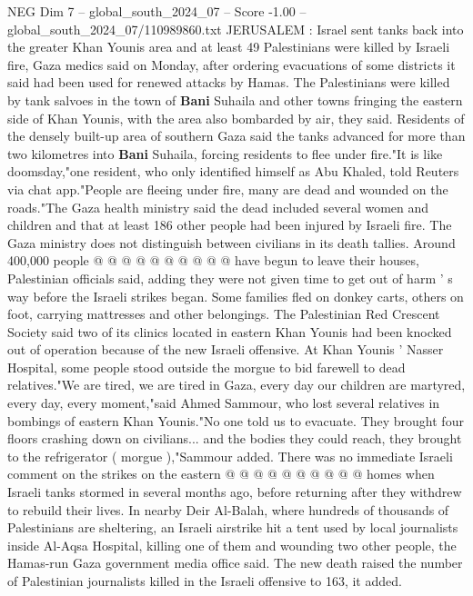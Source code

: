 \begin{textsample}{NEG Dim 7 – global\_south\_2024\_07 – Score -1.00 – global\_south\_2024\_07/110989860.txt}  \label{ex:f7_neg_351}
JERUSALEM : Israel sent tanks back into the greater Khan Younis area and at least 49 Palestinians were killed by Israeli fire, Gaza medics said on Monday, after ordering evacuations of some districts it said had been used for renewed attacks by Hamas.
The Palestinians were killed by tank salvoes in the town of \textbf{Bani} Suhaila and other towns fringing the eastern side of Khan Younis, with the area also bombarded by air, they said.
Residents of the densely built-up area of southern Gaza said the tanks advanced for more than two kilometres into \textbf{Bani} Suhaila, forcing residents to flee under fire."It is like doomsday,"one resident, who only identified himself as Abu Khaled, told Reuters via chat app."People are fleeing under fire, many are dead and wounded on the roads."The Gaza health ministry said the dead included several women and children and that at least 186 other people had been injured by Israeli fire.
The Gaza ministry does not distinguish between civilians in its death tallies.
Around 400,000 people @ @ @ @ @ @ @ @ @ @ have begun to leave their houses, Palestinian officials said, adding they were not given time to get out of harm ' s way before the Israeli strikes began.
Some families fled on donkey carts, others on foot, carrying mattresses and other belongings.
The Palestinian Red Crescent Society said two of its clinics located in eastern Khan Younis had been knocked out of operation because of the new Israeli offensive.
At Khan Younis ' Nasser Hospital, some people stood outside the morgue to bid farewell to dead relatives."We are tired, we are tired in Gaza, every day our children are martyred, every day, every moment,"said Ahmed Sammour, who lost several relatives in bombings of eastern Khan Younis."No one told us to evacuate.
They brought four floors crashing down on civilians... and the bodies they could reach, they brought to the refrigerator ( morgue ),"Sammour added.
There was no immediate Israeli comment on the strikes on the eastern @ @ @ @ @ @ @ @ @ @ homes when Israeli tanks stormed in several months ago, before returning after they withdrew to rebuild their lives.
In nearby Deir Al-Balah, where hundreds of thousands of Palestinians are sheltering, an Israeli airstrike hit a tent used by local journalists inside Al-Aqsa Hospital, killing one of them and wounding two other people, the Hamas-run Gaza government media office said.
The new death raised the number of Palestinian journalists killed in the Israeli offensive to 163, it added.

\end{textsample}
